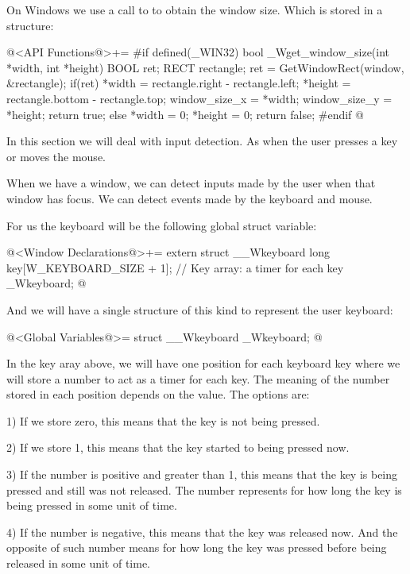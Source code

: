 On Windows we use a call to  to obtain the
window size. Which is stored in a  structure:

\iniciocodigo
@<API Functions@>+=
#if defined(_WIN32)
bool _Wget_window_size(int *width, int *height){
  BOOL ret;
  RECT rectangle;
  ret = GetWindowRect(window, &rectangle);
  if(ret){
    *width = rectangle.right - rectangle.left;
    *height = rectangle.bottom - rectangle.top;
    window_size_x = *width;
    window_size_y = *height;
    return true;
  }
  else{
    *width = 0;
    *height = 0;
    return false;
  }
}
#endif
@
\fimcodigo


In this section we will deal with input detection. As when the user
presses a key or moves the mouse.


When we have a window, we can detect inputs made by the user when that
window has focus. We can detect events made by the keyboard and mouse.

For us the keyboard will be the following global struct variable:

\iniciocodigo
@<Window Declarations@>+=
extern struct __Wkeyboard{
  long key[W_KEYBOARD_SIZE + 1]; // Key array: a timer for each key
} _Wkeyboard;
@
\fimcodigo

And we will have a single structure of this kind to represent the user
keyboard:

\iniciocodigo
@<Global Variables@>=
struct __Wkeyboard _Wkeyboard;
@
\fimcodigo


In the key aray above, we will have one position for each keyboard key
where we will store a number to act as a timer for each key. The
meaning of the number stored in each position depends on the
value. The options are:

1) If we store zero, this means that the key is not being pressed.

2) If we store 1, this means that the key started to being pressed now.

3) If the number is positive and greater than 1, this means that the
key is being pressed and still was not released. The number represents
for how long the key is being pressed in some unit of time.

4) If the number is negative, this means that the key was released
now. And the opposite of such number means for how long the key was
pressed before being released in some unit of time.


